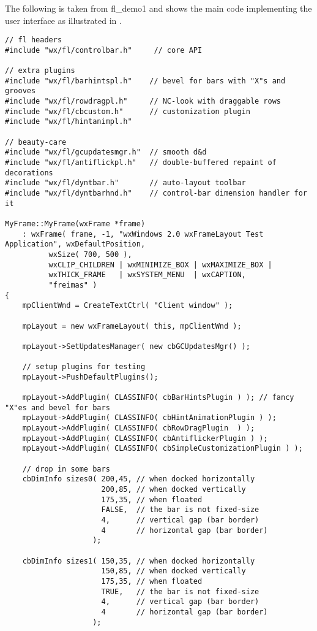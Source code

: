 The following is taken from fl\_demo1 and shows the main code implementing the
user interface as illustrated in .

\begin{verbatim}
// fl headers
#include "wx/fl/controlbar.h"     // core API

// extra plugins
#include "wx/fl/barhintspl.h"    // bevel for bars with "X"s and grooves
#include "wx/fl/rowdragpl.h"     // NC-look with draggable rows
#include "wx/fl/cbcustom.h"      // customization plugin
#include "wx/fl/hintanimpl.h"

// beauty-care
#include "wx/fl/gcupdatesmgr.h"  // smooth d&d
#include "wx/fl/antiflickpl.h"   // double-buffered repaint of decorations
#include "wx/fl/dyntbar.h"       // auto-layout toolbar
#include "wx/fl/dyntbarhnd.h"    // control-bar dimension handler for it

MyFrame::MyFrame(wxFrame *frame)
    : wxFrame( frame, -1, "wxWindows 2.0 wxFrameLayout Test Application", wxDefaultPosition, 
          wxSize( 700, 500 ), 
          wxCLIP_CHILDREN | wxMINIMIZE_BOX | wxMAXIMIZE_BOX | 
          wxTHICK_FRAME   | wxSYSTEM_MENU  | wxCAPTION, 
          "freimas" )
{
    mpClientWnd = CreateTextCtrl( "Client window" );
    
    mpLayout = new wxFrameLayout( this, mpClientWnd );
    
    mpLayout->SetUpdatesManager( new cbGCUpdatesMgr() );
    
    // setup plugins for testing
    mpLayout->PushDefaultPlugins();
    
    mpLayout->AddPlugin( CLASSINFO( cbBarHintsPlugin ) ); // fancy "X"es and bevel for bars
    mpLayout->AddPlugin( CLASSINFO( cbHintAnimationPlugin ) );
    mpLayout->AddPlugin( CLASSINFO( cbRowDragPlugin  ) );
    mpLayout->AddPlugin( CLASSINFO( cbAntiflickerPlugin ) );
    mpLayout->AddPlugin( CLASSINFO( cbSimpleCustomizationPlugin ) );
    
    // drop in some bars
    cbDimInfo sizes0( 200,45, // when docked horizontally      
                      200,85, // when docked vertically        
                      175,35, // when floated                  
                      FALSE,  // the bar is not fixed-size
                      4,      // vertical gap (bar border)
                      4       // horizontal gap (bar border)
                    ); 
    
    cbDimInfo sizes1( 150,35, // when docked horizontally      
                      150,85, // when docked vertically        
                      175,35, // when floated                  
                      TRUE,   // the bar is not fixed-size
                      4,      // vertical gap (bar border)
                      4       // horizontal gap (bar border)
                    ); 
    

\end{verbatim}
